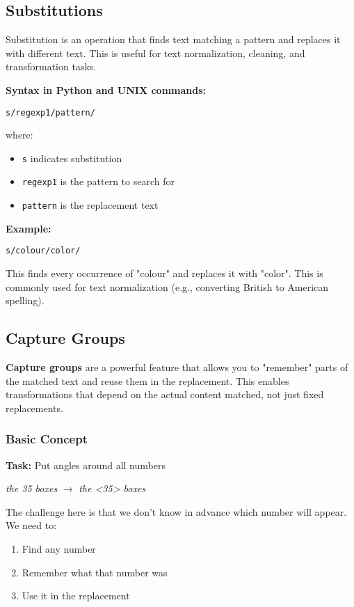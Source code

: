 \documentclass[11pt,a4paper]{article}
\theoremstyle{definition}
\theoremstyle{plain}
\theoremstyle{remark}
\begin{document}
\subsection{Substitutions}

Substitution is an operation that finds text matching a pattern and replaces it with different text. This is useful for text normalization, cleaning, and transformation tasks.

\textbf{Syntax in Python and UNIX commands:}

\texttt{s/regexp1/pattern/}

where:
\begin{itemize}
    \item \texttt{s} indicates substitution
    \item \texttt{regexp1} is the pattern to search for
    \item \texttt{pattern} is the replacement text
\end{itemize}

\textbf{Example:}

\texttt{s/colour/color/}

This finds every occurrence of "colour" and replaces it with "color". This is commonly used for text normalization (e.g., converting British to American spelling).

\subsection{Capture Groups}

\textbf{Capture groups} are a powerful feature that allows you to "remember" parts of the matched text and reuse them in the replacement. This enables transformations that depend on the actual content matched, not just fixed replacements.

\subsubsection{Basic Concept}

\textbf{Task:} Put angles around all numbers

\textit{the 35 boxes} $\rightarrow$ \textit{the <35> boxes}

The challenge here is that we don't know in advance which number will appear. We need to:
\begin{enumerate}
    \item Find any number
    \item Remember what that number was
    \item Use it in the replacement
\end{enumerate}
\end{document}
